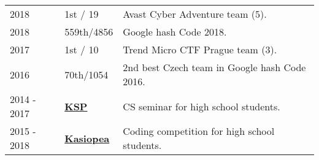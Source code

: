 \documentclass[a4paper]{deedy-resume} %
\begin{document}
\begin{minipage}[t]{0.62\textwidth}
\begin{tabular}{lll}
2018 & 1st / 19 & Avast Cyber Adventure team (5). \\
2018 & 559th/4856 & Google hash Code 2018. \\
2017 & 1st / 10 & Trend Micro CTF Prague team (3). \\
2016 & 70th/1054 & 2nd best Czech team in Google hash Code 2016. \\
2014 - 2017 & \href{https://ksp.mff.cuni.cz/}{\bf KSP} & CS seminar for high school students. \\
2015 - 2018 & \href{https://kasiopea.matfyz.cz/}{\bf Kasiopea} & Coding competition for high school students. \\
\end{tabular}

\sectionspace %



\sectionspace %


\end{minipage} %








\end{document}
